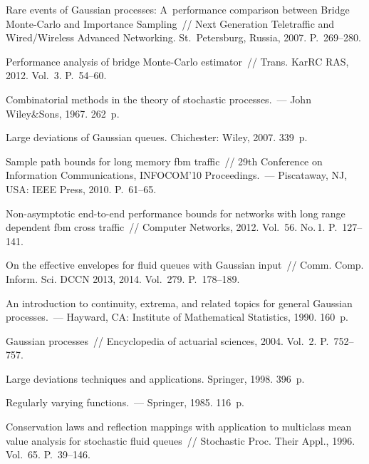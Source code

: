 \begin{multicols}{2}
{{\begin{thebibliography}{99}
Rare events of Gaussian processes:
A~performance comparison between Bridge Monte-Carlo and Importance Sampling~//
{Next Generation Teletraffic and Wired/Wireless Advanced Networking}.
St.\ Petersburg, Russia, 2007. P.~269--280.


Performance analysis of bridge Monte-Carlo estimator~//
Trans. KarRC RAS, 2012. Vol.~3. P.~54--60.


{Combinatorial methods in the theory of stochastic processes}.~---
John Wiley\&Sons, 1967. 262~p.

  {Large deviations of Gaussian queues}.
Chichester: Wiley, 2007. 339~p.


Sample path bounds for long memory fbm traffic~//
{29th Conference on Information Communications, INFOCOM'10 Proceedings}.~---
Piscataway, NJ, USA: IEEE Press, 2010. P.~61--65.

Non-asymptotic end-to-end performance bounds
for networks with long range dependent fbm cross traffic~//
{Computer Networks}, 2012. Vol.~56. No.\,1. P.~127--141.

On the effective envelopes for fluid queues with Gaussian input~//
Comm. Comp. Inform. Sci. DCCN 2013,  2014.
Vol.~279. P.~178--189.

 {An introduction to continuity, extrema, and
related topics for general Gaussian processes}.~--- Hayward, CA: Institute of
Mathematical Statistics, 1990. 160~p.


 Gaussian processes~// {Encyclopedia of actuarial
sciences}, 2004. Vol.~2. P.~752--757.

{Large deviations techniques and applications}. Springer, 1998. 396~p.



  {Regularly varying functions}.~--- Springer, 1985. 116~p.

Conservation
laws and reflection mappings with application to multiclass mean
value analysis for stochastic fluid queues~// {Stochastic
Proc. Their Appl.}, 1996. Vol.~65. P.~39--146.


\end{thebibliography}}}
\end{multicols}
